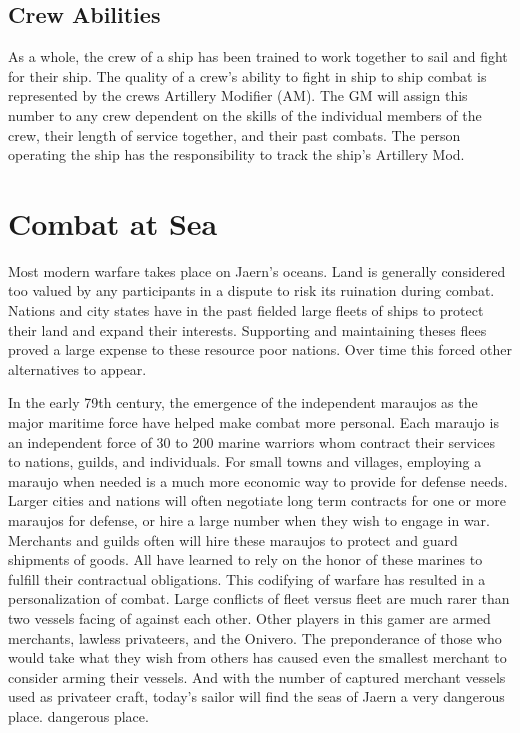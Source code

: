 \subsection{Crew Abilities}
As a whole, the crew of a ship has been trained to work together to sail and fight for their ship. The quality of a crew's ability to fight in ship to ship combat is represented by
the crews Artillery Modifier (AM). The GM will assign this number to any crew dependent on the skills of the individual members of the crew, their length of service together, and their past combats. The person operating the ship has the responsibility to track the ship's Artillery Mod.
\section{Combat at Sea}
Most modern warfare takes place on Jaern's oceans. Land is generally considered too valued by any participants in a dispute to risk its ruination during combat. Nations and city
states have in the past fielded large fleets of ships to protect their land and expand their interests. Supporting and maintaining theses flees proved a large expense to these resource poor nations. Over time this forced other alternatives to appear.

In the early 79th century, the emergence of the independent maraujos as the major maritime force have helped make combat more personal. Each maraujo is an independent force of 30 to 200 marine warriors whom contract their services to nations, guilds, and individuals. For small towns and villages, employing a maraujo when needed is a much more economic way to provide for defense needs. Larger cities and nations will often negotiate long term contracts for one or more maraujos for defense, or hire a large number when they wish to engage in war. Merchants and guilds often will hire these maraujos to protect and guard shipments of goods. All have learned to rely on the honor of these marines to fulfill their contractual obligations.
This codifying of warfare has resulted in a personalization of combat. Large conflicts of fleet versus fleet are much rarer than two vessels facing of against each other. Other players in this gamer are armed merchants, lawless privateers, and the Onivero. The preponderance of those who would take what they wish from others has caused even the smallest merchant to consider arming their vessels. And with the number of captured merchant vessels used as privateer craft, today's sailor will find the seas of Jaern a very dangerous place.
dangerous place.
